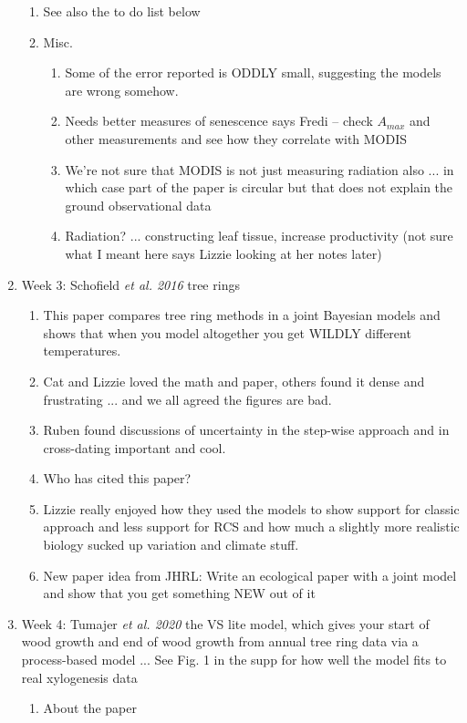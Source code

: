 \documentclass[11pt,letter]{article}
\begin{document}
\begin{enumerate}
\begin{enumerate}
\item See also the to do list below
\item Misc.
\begin{enumerate}
\item Some of the error reported is ODDLY small, suggesting the models are wrong somehow.
\item Needs better measures of senescence says Fredi -- check $A_{max}$ and other measurements and see how they correlate with MODIS
\item We're not sure that MODIS is not just measuring radiation also ... in which case part of the paper is circular but that does not explain the ground observational data
\item Radiation? ... constructing leaf tissue, increase productivity (not sure what I meant here says Lizzie looking at her notes later)
\end{enumerate}
\end{enumerate}
\item Week 3: Schofield \emph{et al. 2016} tree rings
\begin{enumerate}
\item This paper compares tree ring methods in a joint Bayesian models and shows that when you model altogether you get WILDLY different temperatures. 
\item Cat and Lizzie loved the math and paper, others found it dense and frustrating ... and we all agreed the figures are bad.
\item Ruben found discussions of uncertainty in the step-wise approach and in cross-dating important and cool.
\item Who has cited this paper?
\item Lizzie really enjoyed how they used the models to show support for classic approach and less support for RCS and how much a slightly more realistic biology sucked up variation and climate stuff. 
\item New paper idea from JHRL: Write an ecological paper with a joint model and show that you get something NEW out of it 
\end{enumerate}
\item Week 4:  Tumajer \emph{et al. 2020} the VS lite model, which gives your start of wood growth and end of wood growth from annual tree ring data via a process-based model ... See Fig. 1 in the supp for how well the model fits to real xylogenesis data
\begin{enumerate}
\item About the paper

\end{enumerate}
\end{enumerate}
\end{document}

